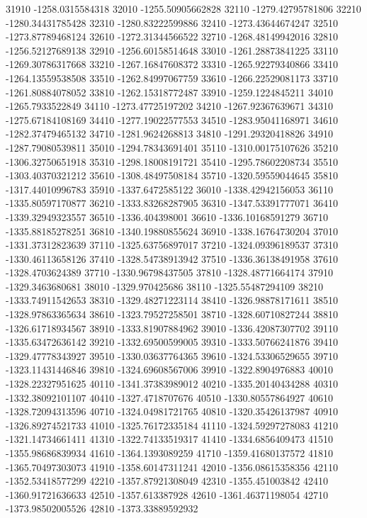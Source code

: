 {31910 -1258.0315584318
32010 -1255.50905662828
32110 -1279.42795781806
32210 -1280.34431785428
32310 -1280.83222599886
32410 -1273.43644674247
32510 -1273.87789468124
32610 -1272.31344566522
32710 -1268.48149942016
32810 -1256.52127689138
32910 -1256.60158514648
33010 -1261.28873841225
33110 -1269.30786317668
33210 -1267.16847608372
33310 -1265.92279340866
33410 -1264.13559538508
33510 -1262.84997067759
33610 -1266.22529081173
33710 -1261.80884078052
33810 -1262.15318772487
33910 -1259.1224845211
34010 -1265.7933522849
34110 -1273.47725197202
34210 -1267.92367639671
34310 -1275.67184108169
34410 -1277.19022577553
34510 -1283.95041168971
34610 -1282.37479465132
34710 -1281.9624268813
34810 -1291.29320418826
34910 -1287.79080539811
35010 -1294.78343691401
35110 -1310.00175107626
35210 -1306.32750651918
35310 -1298.18008191721
35410 -1295.78602208734
35510 -1303.40370321212
35610 -1308.48497508184
35710 -1320.59559044645
35810 -1317.44010996783
35910 -1337.6472585122
36010 -1338.42942156053
36110 -1335.80597170877
36210 -1333.83268287905
36310 -1347.53391777071
36410 -1339.32949323557
36510 -1336.404398001
36610 -1336.10168591279
36710 -1335.88185278251
36810 -1340.19880855624
36910 -1338.16764730204
37010 -1331.37312823639
37110 -1325.63756897017
37210 -1324.09396189537
37310 -1330.46113658126
37410 -1328.54738913942
37510 -1336.36138491958
37610 -1328.4703624389
37710 -1330.96798437505
37810 -1328.48771664174
37910 -1329.3463680681
38010 -1329.970425686
38110 -1325.55487294109
38210 -1333.74911542653
38310 -1329.48271223114
38410 -1326.98878171611
38510 -1328.97863365634
38610 -1323.79527258501
38710 -1328.60710827244
38810 -1326.61718934567
38910 -1333.81907884962
39010 -1336.42087307702
39110 -1335.63472636142
39210 -1332.69500599005
39310 -1333.50766241876
39410 -1329.47778343927
39510 -1330.03637764365
39610 -1324.53306529655
39710 -1323.11431446846
39810 -1324.69608567006
39910 -1322.8904976883
40010 -1328.22327951625
40110 -1341.37383989012
40210 -1335.20140434288
40310 -1332.38092101107
40410 -1327.4718707676
40510 -1330.80557864927
40610 -1328.72094313596
40710 -1324.04981721765
40810 -1320.35426137987
40910 -1326.89274521733
41010 -1325.76172335184
41110 -1324.59297278083
41210 -1321.14734661411
41310 -1322.74133519317
41410 -1334.6856409473
41510 -1355.98686839934
41610 -1364.1393089259
41710 -1359.41680137572
41810 -1365.70497303073
41910 -1358.60147311241
42010 -1356.08615358356
42110 -1352.53418577299
42210 -1357.87921308049
42310 -1355.451003842
42410 -1360.91721636633
42510 -1357.613387928
42610 -1361.46371198054
42710 -1373.98502005526
42810 -1373.33889592932
}
